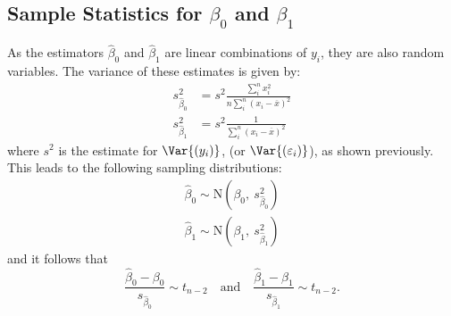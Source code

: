 \documentclass{article}
\begin{document}
\subsection{Sample Statistics for \texorpdfstring{\(\beta_0\)}{beta 0} and \texorpdfstring{\(\beta_1\)}{beta 1}}
As the estimators \(\hat{\beta}_0\) and \(\hat{\beta}_1\) are linear combinations of \(y_i\), they are also random variables. The variance of these estimates is given by:
\begin{align*}
    s_{\hat{\beta}_0}^2 & = s^2 \frac{\sum_i^n x_i^2}{n\sum_i^n \left( x_i - \overline{x} \right)^2} \\
    s_{\hat{\beta}_1}^2 & = s^2 \frac{1}{\sum_i^n \left( x_i - \overline{x} \right)^2}
\end{align*}
where \(s^2\) is the estimate for \(\Var{\left( y_i \right)}\), (or \(\Var{\left( \varepsilon_i \right)}\)), as shown previously.
This leads to the following sampling distributions:
\begin{align*}
    \hat{\beta}_0 \sim \mathrm{N}{\left( \beta_0,\: s_{\hat{\beta}_0}^2 \right)} \\
    \hat{\beta}_1 \sim \mathrm{N}{\left( \beta_1,\: s_{\hat{\beta}_1}^2 \right)}
\end{align*}
and it follows that
\begin{equation*}
    \frac{\hat{\beta}_0 - \beta_0}{s_{\hat{\beta}_0}} \sim t_{n-2} \quad \text{and} \quad \frac{\hat{\beta}_1 - \beta_1}{s_{\hat{\beta}_1}} \sim t_{n-2}.
\end{equation*}
\end{document}
